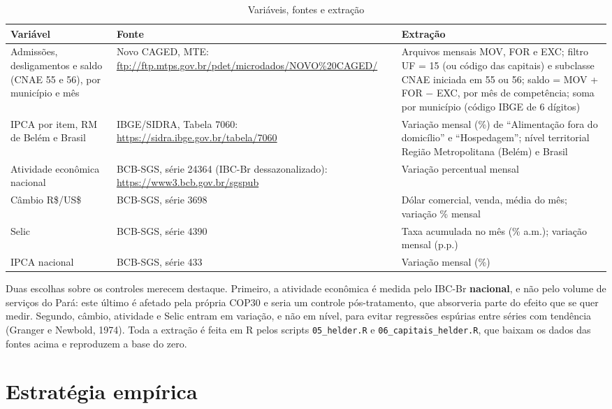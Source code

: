 \documentclass[12pt,a4paper]{article}
\begin{document}
\begin{table}[H]
\centering\footnotesize
\caption{Variáveis, fontes e extração}\label{tab:dados}
\begin{tabularx}{\linewidth}{p{3.1cm}p{3.3cm}L}
\toprule
\textbf{Variável} & \textbf{Fonte} & \textbf{Extração}\\
\midrule
Admissões, desligamentos e saldo (CNAE 55 e 56), por município e mês &
Novo CAGED, MTE: \url{ftp://ftp.mtps.gov.br/pdet/microdados/NOVO\%20CAGED/} &
Arquivos mensais MOV, FOR e EXC; filtro UF = 15 (ou código das capitais) e subclasse CNAE iniciada em
55 ou 56; saldo = MOV + FOR $-$ EXC, por mês de competência; soma por município (código IBGE de 6
dígitos)\\
\addlinespace
IPCA por item, RM de Belém e Brasil & IBGE/SIDRA, Tabela 7060: \url{https://sidra.ibge.gov.br/tabela/7060} &
Variação mensal (\%) de ``Alimentação fora do domicílio'' e ``Hospedagem''; nível territorial Região
Metropolitana (Belém) e Brasil\\
\addlinespace
Atividade econômica nacional & BCB-SGS, série 24364 (IBC-Br dessazonalizado): \url{https://www3.bcb.gov.br/sgspub} &
Variação percentual mensal\\
\addlinespace
Câmbio R\$/US\$ & BCB-SGS, série 3698 & Dólar comercial, venda, média do mês; variação \% mensal\\
\addlinespace
Selic & BCB-SGS, série 4390 & Taxa acumulada no mês (\% a.m.); variação mensal (p.p.)\\
\addlinespace
IPCA nacional & BCB-SGS, série 433 & Variação mensal (\%)\\
\bottomrule
\end{tabularx}
\end{table}

Duas escolhas sobre os controles merecem destaque. Primeiro, a atividade econômica é medida pelo
IBC-Br \textbf{nacional}, e não pelo volume de serviços do Pará: este último é afetado pela própria
COP30 e seria um controle pós-tratamento, que absorveria parte do efeito que se quer medir. Segundo,
câmbio, atividade e Selic entram em variação, e não em nível, para evitar regressões espúrias entre
séries com tendência (Granger e Newbold, 1974). Toda a extração é feita em R pelos scripts
\texttt{05\_helder.R} e \texttt{06\_capitais\_helder.R}, que baixam os dados das fontes acima e
reproduzem a base do zero.

\section{Estratégia empírica}
\end{document}
